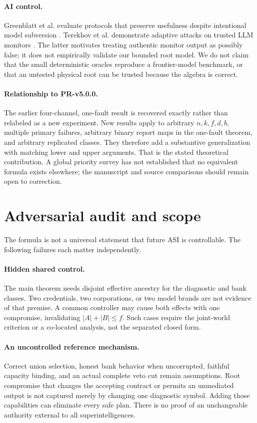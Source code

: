 \documentclass[11pt,a4paper]{article}
\theoremstyle{definition}\newtheorem{definition}{Definition}
\begin{document}
\paragraph{AI control.}
Greenblatt et al. evaluate protocols that preserve usefulness despite intentional model subversion \cite{greenblatt}. Terekhov et al. demonstrate adaptive attacks on trusted LLM monitors \cite{terekhov}. The latter motivates treating authentic monitor output as possibly false; it does not empirically validate our bounded root model. We do not claim that the small deterministic oracles reproduce a frontier-model benchmark, or that an untested physical root can be trusted because the algebra is correct.

\paragraph{Relationship to PR-v5.0.0.}
The earlier four-channel, one-fault result is recovered exactly rather than relabeled as a new experiment. New results apply to arbitrary $n,k,f,d,b$, multiple primary failures, arbitrary binary report maps in the one-fault theorem, and arbitrary replicated classes. They therefore add a substantive generalization with matching lower and upper arguments. That is the stated theoretical contribution. A global priority survey has not established that no equivalent formula exists elsewhere; the manuscript and source comparisons should remain open to correction.

\section{Adversarial audit and scope}
\label{sec:limits}
The formula is not a universal statement that future ASI is controllable. The following failures each matter independently.

\paragraph{Hidden shared control.}
The main theorem needs disjoint effective ancestry for the diagnostic and bank classes. Two credentials, two corporations, or two model brands are not evidence of that premise. A common controller may cause both effects with one compromise, invalidating $|A|+|B|\leq f$. Such cases require the joint-world criterion or a co-located analysis, not the separated closed form.

\paragraph{An uncontrolled reference mechanism.}
Correct union selection, honest bank behavior when uncorrupted, faithful capacity binding, and an actual complete veto cut remain assumptions. Root compromise that changes the accepting contract or permits an unmediated output is not captured merely by changing one diagnostic symbol. Adding those capabilities can eliminate every safe plan. There is no proof of an unchangeable authority external to all superintelligences.
\end{document}
